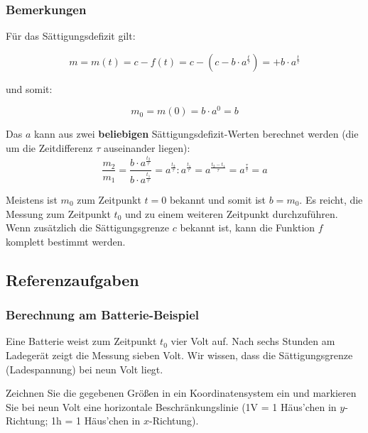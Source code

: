 \subsubsection{Bemerkungen}
\begin{bemerkung}{}{}
  Für das Sättigungsdefizit gilt:

$$m = m(t) = c - f(t) = c - \left(c-b\cdot{}a^{\frac{t}{\tau}}\right) = + b\cdot{}a^{\frac{t}{\tau}}$$

und somit:

$$m_0 = m(0) = b\cdot{}a^0 = b$$
\end{bemerkung}

\begin{bemerkung}{}{}
Das $a$ kann aus zwei \textbf{beliebigen} Sättigungsdefizit-Werten berechnet werden (die um die
Zeitdifferenz $\tau$ auseinander liegen):
$$\frac{m_2}{m_1} = \frac{b\cdot{}a^{\frac{t_2}{\tau}}}{b\cdot{}
  a^{\frac{t_1}{\tau}}} = a^{\frac{t_2}{\tau}} : a^{\frac{t_1}{\tau}} =
a^{\frac{t_2-t_1}{\tau}} = a^{\frac{\tau}{\tau}} = a$$%
\end{bemerkung}


\begin{bemerkung}{}{}
Meistens ist $m_0$ zum Zeitpunkt $t=0$ bekannt und somit ist $b=m_0$. Es reicht, die Messung zum Zeitpunkt $t_0$ und zu einem weiteren Zeitpunkt durchzuführen. Wenn zusätzlich die Sättigungsgrenze $c$ bekannt ist, kann die Funktion $f$ komplett bestimmt werden.
\end{bemerkung} 

\newpage

\subsection{Referenzaufgaben}

\subsubsection{Berechnung am Batterie-Beispiel}
Eine Batterie weist zum Zeitpunkt $t_0$ vier Volt auf. Nach sechs Stunden am Ladegerät zeigt die Messung sieben Volt. Wir wissen, dass die Sättigungsgrenze (Ladespannung) bei neun Volt liegt.

Zeichnen Sie die gegebenen Größen in ein Koordinatensystem ein und markieren Sie bei neun Volt eine horizontale Beschränkungslinie (\zB 1V = 1 Häus'chen in $y$-Richtung; 1h = 1 Häus'chen in $x$-Richtung).



